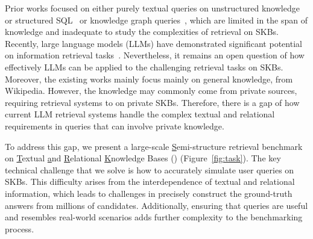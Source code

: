 
 Prior works focused on either purely textual queries on unstructured knowledge~\cite{IzacardG21, realm, KarpukhinOMLWEC20, LeeCT19, YangXLLTXLL19, dunn2017searchqa, TriviaQA, yang2018hotpotqa} or structured SQL~\cite{zhongSeq2SQL2017, yu-etal-2018-spider, zhongSeq2SQL2017, yu-etal-2018-spider} or knowledge graph queries~\cite{BerantCFL13, YihCHG15, h2t, ComplexWebQuestions, yih-etal-2016-value,talmor-berant-2018-web,cao-etal-2022-kqa,GAO_FODOR_KIFER_2019,he2024gretriever,AsaiHHSX20}, which are limited in the span of knowledge and inadequate to study the complexities of retrieval on SKBs. Recently, large language models (LLMs) have demonstrated significant potential on information retrieval tasks~\cite{llm4ir, realm, rag, replug}. Nevertheless, it remains an open question of how effectively LLMs can be applied to the challenging retrieval tasks on SKBs.  Moreover, the existing works mainly focus mainly on general knowledge, \eg from Wikipedia. However, the knowledge may commonly come from private sources, requiring retrieval systems to  on private SKBs. Therefore, there is a gap of how current LLM retrieval systems handle the complex textual and relational requirements in queries that can involve private knowledge. 

To address this gap, we present a large-scale \underline{S}emi-structure retrieval benchmark on \underline{T}extual \underline{a}nd \underline{R}elational \underline{K}nowledge Bases (\benchmarkt) (Figure~\ref{fig:task}). The key technical challenge that we solve is how to accurately simulate user queries on SKBs. This difficulty arises from the interdependence of textual and relational information, which leads to challenges in precisely construct the ground-truth answers from millions of candidates. Additionally, ensuring that queries are useful and resembles real-world scenarios adds further complexity to the benchmarking process. 
 
